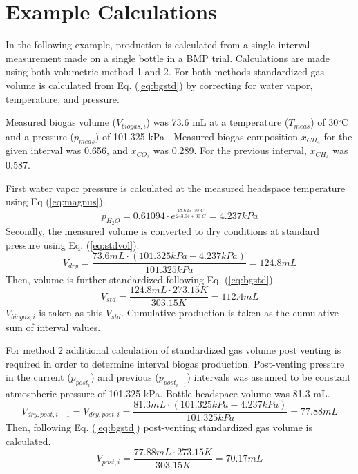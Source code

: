

\section{Example Calculations}
In the following example,  production is calculated from a single interval measurement made on a single bottle in a BMP trial. Calculations are made using both volumetric method 1 and 2. 
For both methods standardized gas volume is calculated from Eq. (\ref{eq:bgstd}) by correcting for water vapor, temperature, and pressure.

Measured biogas volume ($V_{biogas,i}$) was 73.6 mL at a temperature ($T_{meas}$) of 30$^\circ$C and a pressure ($p_{meas}$) of 101.325 kPa .
Measured biogas composition $x_{CH_4}$ for the given interval was 0.656, and $x_{CO_2}$ was 0.289. For the previous interval, $x_{CH_4}$ was 0.587.

First water vapor pressure is calculated at the measured headspace temperature using Eq (\ref{eq:magnus}).
\begin{equation*}
   p_{H_2O} = 0.61094 \cdot e^{\frac{17.625 \cdot 30^\circ C}{243.04 + 30^\circ C}} = 4.237\unit{kPa}
\end{equation*}
Secondly, the measured volume is converted to dry conditions at standard pressure using Eq. (\ref{eq:stdvol}).
\begin{equation*}
   V_{dry} = \frac{73.6\unit{mL} \cdot (101.325\unit{kPa} - 4.237\unit{kPa})}{101.325\unit{kPa}} = 124.8\unit{mL}  
\end{equation*}
Then, volume is further standardized following Eq. (\ref{eq:bgstd}).
\begin{equation*}
    V_{std} = \frac{124.8\unit{mL} \cdot 273.15\unit{K}}{303.15\unit{K}} = 112.4\unit{mL}  
\end{equation*}
$V_{biogas,i}$ is taken as this $V_{std}$. Cumulative production is taken as the cumulative sum of interval values.

For method 2 additional calculation of standardized gas volume post venting is required in order to determine interval biogas production. 
Post-venting pressure in the current ($p_{post_{i}}$) and previous ($p_{post_{i-1}}$) intervals was assumed to be constant atmospheric pressure of 101.325 kPa. 
Bottle headspace volume was 81.3 mL. 
\begin{equation*}
   V_{dry,post,i-1} = V_{dry,post,i} = \frac{81.3\unit{mL} \cdot (101.325\unit{kPa} - 4.237\unit{kPa})}{101.325\unit{kPa}} = 77.88\unit{mL}  
\end{equation*}
Then, following Eq. (\ref{eq:bgstd}) post-venting standardized gas volume is calculated.
\begin{equation*}
    V_{post,i} = \frac{77.88\unit{mL} \cdot 273.15\unit{K}}{303.15\unit{K}} = 70.17\unit{mL}  
\end{equation*}

